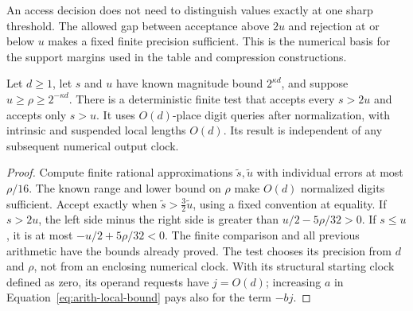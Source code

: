 An access decision does not need to distinguish values exactly at one sharp threshold. The allowed gap between acceptance above $2u$ and rejection at or below $u$ makes a fixed finite precision sufficient. This is the numerical basis for the support margins used in the table and compression constructions.

\begin{lemma}
\label{lem:arith-buffered-test}
Let $d\geq1$, let $s$ and $u$ have known magnitude bound $2^{\kappa d}$,
and suppose $u\geq\rho\geq2^{-\kappa d}$.  There is a deterministic
finite test that accepts every $s>2u$ and accepts only $s>u$.
It uses $O(d)$-place digit queries after normalization, with
intrinsic and suspended local lengths $O(d)$.  Its result is
independent of any subsequent numerical output clock.
\end{lemma}

\begin{proof}
Compute finite rational approximations $\widetilde s,\widetilde u$
with individual errors at most $\rho/16$.  The known range and
lower bound on $\rho$ make $O(d)$ normalized digits sufficient.
Accept exactly when
$\widetilde s>\tfrac32\widetilde u$, using a fixed convention
at equality.  If $s>2u$, the left side minus the right side is
greater than $u/2-5\rho/32>0$.  If $s\leq u$, it is at most
$-u/2+5\rho/32<0$.  The finite comparison and all previous
arithmetic have the bounds already proved.  The test chooses its
precision from $d$ and $\rho$, not from an enclosing numerical
clock.  With its structural starting clock defined as zero, its
operand requests have $j=O(d)$; increasing $a$ in
Equation~\eqref{eq:arith-local-bound} pays also for the term $-bj$.
\end{proof}

